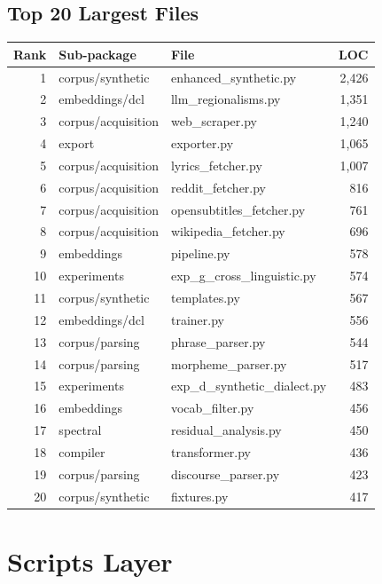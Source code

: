 \documentclass[11pt,a4paper]{article}
\begin{document}
\subsection{Top 20 Largest Files}

\begin{longtable}{@{}rllr@{}}
\toprule
\textbf{Rank} & \textbf{Sub-package} & \textbf{File} & \textbf{LOC} \\
\midrule
\endhead
1 & corpus/synthetic & enhanced\_synthetic.py & 2{,}426 \\
2 & embeddings/dcl & llm\_regionalisms.py & 1{,}351 \\
3 & corpus/acquisition & web\_scraper.py & 1{,}240 \\
4 & export & exporter.py & 1{,}065 \\
5 & corpus/acquisition & lyrics\_fetcher.py & 1{,}007 \\
6 & corpus/acquisition & reddit\_fetcher.py & 816 \\
7 & corpus/acquisition & opensubtitles\_fetcher.py & 761 \\
8 & corpus/acquisition & wikipedia\_fetcher.py & 696 \\
9 & embeddings & pipeline.py & 578 \\
10 & experiments & exp\_g\_cross\_linguistic.py & 574 \\
11 & corpus/synthetic & templates.py & 567 \\
12 & embeddings/dcl & trainer.py & 556 \\
13 & corpus/parsing & phrase\_parser.py & 544 \\
14 & corpus/parsing & morpheme\_parser.py & 517 \\
15 & experiments & exp\_d\_synthetic\_dialect.py & 483 \\
16 & embeddings & vocab\_filter.py & 456 \\
17 & spectral & residual\_analysis.py & 450 \\
18 & compiler & transformer.py & 436 \\
19 & corpus/parsing & discourse\_parser.py & 423 \\
20 & corpus/synthetic & fixtures.py & 417 \\
\bottomrule
\end{longtable}


\section{Scripts Layer}
\end{document}
